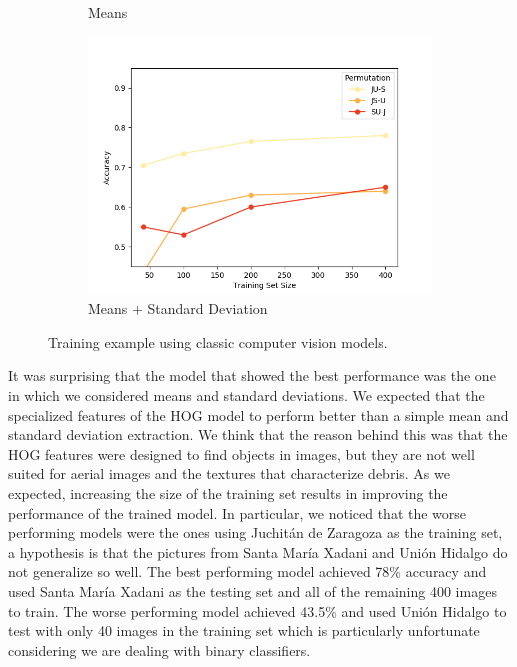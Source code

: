 \begin{figure}[ht]
\begin{subfigure}{.49\textwidth}
        \caption{Means}
    \end{subfigure}
    \begin{subfigure}{.49\textwidth}
        \includegraphics[width=\textwidth]{images/classic-meanstd.png}
        \caption{Means + Standard Deviation}
    \end{subfigure}
  
  \caption{Training example using classic computer vision models.}
  \label{fig:classic}
\end{figure}

It was surprising that the model that showed the best performance was the one in which we considered means and standard deviations. We expected that the specialized features of the HOG model to perform better than a simple mean and standard deviation extraction. We think that the reason behind this was that the HOG features were designed to find objects in images, but they are not well suited for aerial images and the textures that characterize debris. As we expected, increasing the size of the training set results in improving the performance of the trained model. In particular, we noticed that the worse performing models were the ones using Juchit\'an de Zaragoza as the training set, a hypothesis is that the pictures from Santa Mar\'ia Xadani and Uni\'on Hidalgo do not generalize so well. The best performing model achieved 78\% accuracy and used Santa Mar\'ia Xadani as the testing set and all of the remaining 400 images to train. The worse performing model achieved 43.5\% and used Uni\'on Hidalgo to test with only 40 images in the training set which is particularly unfortunate considering we are dealing with binary classifiers.\\


